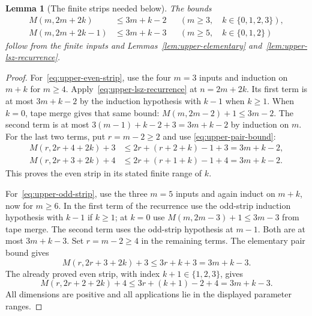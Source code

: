 \documentclass[11pt]{article}
\newtheorem{lemma}[theorem]{Lemma}
\theoremstyle{definition}
\theoremstyle{remark}
\begin{document}
\begin{lemma}[The finite strips needed below]\label{lem:upper-strips}
The bounds
\begin{align}
 M(m,2m+2k)&\le3m+k-2
   &&(m\ge3,\quad k\in\{0,1,2,3\}),\label{eq:upper-even-strip}\\
 M(m,2m+2k-1)&\le3m+k-3
   &&(m\ge5,\quad k\in\{0,1,2\})\label{eq:upper-odd-strip}
\end{align}
follow from the finite inputs and Lemmas~\ref{lem:upper-elementary}
and~\ref{lem:upper-lsz-recurrence}.
\end{lemma}
\begin{proof}
For~\eqref{eq:upper-even-strip}, use the four $m=3$ inputs and induction on
$m+k$ for $m\ge4$.  Apply~\eqref{eq:upper-lsz-recurrence} at $n=2m+2k$.
Its first term is at most $3m+k-2$ by the induction hypothesis with $k-1$
when $k\ge1$.  When $k=0$, tape merge gives that same bound:
$M(m,2m-2)+1\le3m-2$.  The second term is at most
$3(m-1)+k-2+3=3m+k-2$ by induction on $m$.
For the last two terms, put $r=m-2\ge2$ and use
\eqref{eq:upper-pair-bound}:
\begin{align*}
 M(r,2r+4+2k)+3
   &\le 2r+(r+2+k)-1+3=3m+k-2,\\
 M(r,2r+3+2k)+4
   &\le 2r+(r+1+k)-1+4=3m+k-2.
\end{align*}
This proves the even strip in its stated finite range of $k$.

For~\eqref{eq:upper-odd-strip}, use the three $m=5$ inputs and again induct
on $m+k$, now for $m\ge6$.  In the first term of the recurrence use the
odd-strip induction hypothesis with $k-1$ if $k\ge1$; at $k=0$ use
$M(m,2m-3)+1\le3m-3$ from tape merge.  The second term uses the odd-strip
hypothesis at $m-1$.  Both are at most $3m+k-3$.
Set $r=m-2\ge4$ in the remaining terms.  The elementary pair bound gives
\[
 M(r,2r+3+2k)+3\le 3r+k+3=3m+k-3.
\]
The already proved even strip, with index $k+1\in\{1,2,3\}$, gives
\[
 M(r,2r+2+2k)+4\le3r+(k+1)-2+4=3m+k-3.
\]
All dimensions are positive and all applications lie in the displayed
parameter ranges.
\end{proof}
\end{document}
